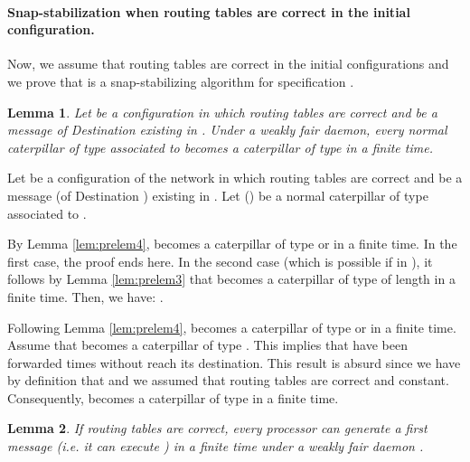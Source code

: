 \documentclass[11pt]{article}
\newtheorem{lemma}{Lemma}
\newenvironment{proof}{{\noindent\bf Proof. } }{{\hfill }}
\begin{document}
\paragraph{Snap-stabilization when routing tables are correct in the initial configuration.} Now, we assume that routing tables are correct in the initial configurations and we prove that \AD is a snap-stabilizing algorithm for specification .

\begin{lemma} \label{lem:chenilleSA}
Let  be a configuration in which routing tables are correct  and  be a message of Destination  existing in . Under a weakly fair daemon, every normal caterpillar of type  associated to  becomes a caterpillar of type  in a finite time.
\end{lemma}

\begin{proof}
Let  be a configuration of the network in which routing tables are correct and  be a message (of Destination ) existing in . Let  () be a normal caterpillar of type  associated to .

By Lemma \ref{lem:prelem4},  becomes a caterpillar of type  or  in a finite time. In the first case, the proof ends here. In the second case (which is possible if  in ), it follows by Lemma \ref{lem:prelem3} that  becomes a caterpillar of type  of length  in a finite time. Then, we have: . 

Following Lemma \ref{lem:prelem4},  becomes a caterpillar of type  or  in a finite time. Assume that  becomes a caterpillar of type . This implies that  have been forwarded  times without reach its destination. This result is absurd since we have by definition that  and we assumed that routing tables are correct and constant. Consequently,  becomes a caterpillar of type  in a finite time.
\end{proof}

\begin{lemma} \label{lem:depotD}
If routing tables are correct, every processor can generate a first message (\emph{i.e.} it can execute ) in a finite time under a weakly fair daemon .
\end{lemma}
\end{document}
